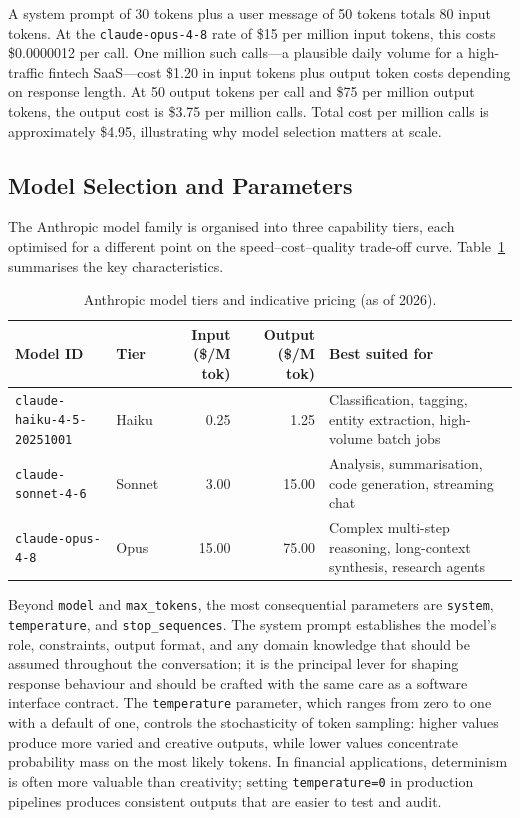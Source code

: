 \begin{example}
\label{ex:token-cost-summary}
A system prompt of 30 tokens plus a user message of 50 tokens totals 80 input tokens.
At the \texttt{claude-opus-4-8} rate of \$15 per million input tokens, this costs
\$0.0000012 per call. One million such calls---a plausible daily volume for a
high-traffic fintech SaaS---cost \$1.20 in input tokens plus output token costs
depending on response length. At 50 output tokens per call and \$75 per million output
tokens, the output cost is \$3.75 per million calls. Total cost per million calls is
approximately \$4.95, illustrating why model selection matters at scale.
\end{example}

\subsection{Model Selection and Parameters}
\label{app:sdk-commercial:sdk:params}

The Anthropic model family is organised into three capability tiers, each optimised for
a different point on the speed--cost--quality trade-off curve. Table~\ref{tab:model-tiers}
summarises the key characteristics.

\begin{table}[H]
  \centering
  \caption{Anthropic model tiers and indicative pricing (as of 2026).}
  \label{tab:model-tiers}
  \begin{tabular}{llrrp{4.5cm}}
    \toprule
    Model ID & Tier & Input (\$/M tok) & Output (\$/M tok) & Best suited for \\
    \midrule
    \texttt{claude-haiku-4-5-20251001} & Haiku & 0.25 & 1.25
      & Classification, tagging, entity extraction, high-volume batch jobs \\
    \texttt{claude-sonnet-4-6}         & Sonnet & 3.00 & 15.00
      & Analysis, summarisation, code generation, streaming chat \\
    \texttt{claude-opus-4-8}           & Opus & 15.00 & 75.00
      & Complex multi-step reasoning, long-context synthesis, research agents \\
    \bottomrule
  \end{tabular}
\end{table}

Beyond \texttt{model} and \texttt{max\_tokens}, the most consequential parameters are
\texttt{system}, \texttt{temperature}, and \texttt{stop\_sequences}. The system prompt
establishes the model's role, constraints, output format, and any domain knowledge that
should be assumed throughout the conversation; it is the principal lever for shaping
response behaviour and should be crafted with the same care as a software interface
contract. The \texttt{temperature} parameter, which ranges from zero to one with a
default of one, controls the stochasticity of token sampling: higher values produce
more varied and creative outputs, while lower values concentrate probability mass on the
most likely tokens. In financial applications, determinism is often more valuable than
creativity; setting \texttt{temperature=0} in production pipelines produces consistent
outputs that are easier to test and audit.

